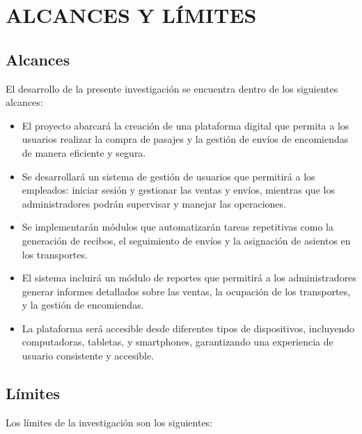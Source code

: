 \documentclass[12pt,letterpaper]{article}
\begin{document}
\section{ALCANCES Y LÍMITES}
\subsection{Alcances}

El desarrollo de la presente investigación se encuentra dentro de los siguientes alcances:

\begin{itemize}[label=$\bullet$, left=0cm, labelsep = 1.05cm, topsep = 0pt, parsep = 0pt]

	\item El proyecto abarcará la creación de una plataforma digital que permita a los usuarios realizar la compra de pasajes y la gestión de envíos de encomiendas de manera eficiente y segura.

	\item Se desarrollará un sistema de gestión de usuarios que permitirá a los empleados: iniciar sesión y gestionar las ventas y envíos, mientras que los administradores podrán supervisar y manejar las operaciones.

	\item Se implementarán módulos que automatizarán tareas repetitivas como la generación de recibos, el seguimiento de envíos y la asignación de asientos en los transportes.

	\item El sistema incluirá un módulo de reportes que permitirá a los administradores generar informes detallados sobre las ventas, la ocupación de los transportes, y la gestión de encomiendas.

	\item La plataforma será accesible desde diferentes tipos de dispositivos, incluyendo computadoras, tabletas, y smartphones, garantizando una experiencia de usuario consistente y accesible.

\end{itemize}

\subsection{Límites}

Los límites de la investigación son los siguientes:
\end{document}
